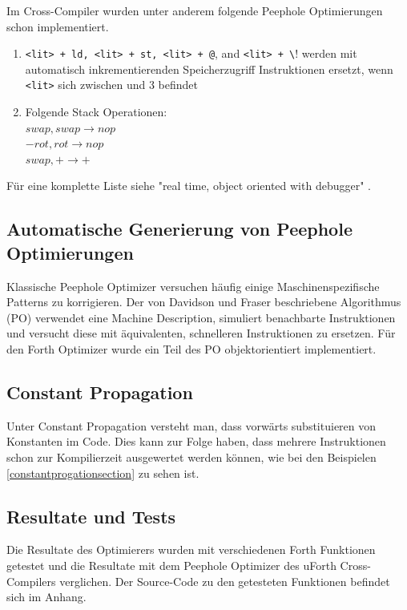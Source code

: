 Im Cross-Compiler wurden unter anderem folgende Peephole Optimierungen schon implementiert.

\begin{enumerate}
  \item \verb!<lit> + ld, <lit> + st, <lit> + @!, and \verb!<lit> + \!! werden mit automatisch inkrementierenden Speicherzugriff Instruktionen ersetzt, wenn \verb!<lit>! sich zwischen  und 3 befindet
  \item Folgende Stack Operationen: \\
				$swap, swap \rightarrow nop$\\
				$-rot, rot \rightarrow nop$\\
				$swap, + \rightarrow +$\\

\end{enumerate}

Für eine komplette Liste siehe "real time, object oriented with debugger" \cite{uforth}.

\newpage
\subsection{Automatische Generierung von Peephole Optimierungen}

Klassische Peephole Optimizer versuchen häufig einige Maschinenspezifische Patterns zu korrigieren. Der von Davidson und Fraser\cite{peepdavidson} beschriebene Algorithmus (PO) verwendet eine Machine Description, simuliert benachbarte Instruktionen und versucht diese mit äquivalenten, schnelleren Instruktionen zu ersetzen. Für den Forth Optimizer wurde ein Teil des PO objektorientiert implementiert.

\subsection{Constant Propagation}
Unter Constant Propagation versteht man, dass vorwärts substituieren von Konstanten im Code. Dies kann zur Folge haben, dass mehrere Instruktionen schon zur Kompilierzeit ausgewertet werden können, wie bei den Beispielen \ref{constantprogationsection} zu sehen ist.

\subsection{Resultate und Tests}
Die Resultate des Optimierers wurden mit verschiedenen Forth Funktionen getestet und die Resultate mit dem Peephole Optimizer des uForth Cross-Compilers verglichen. Der Source-Code zu den getesteten Funktionen befindet sich im Anhang.

